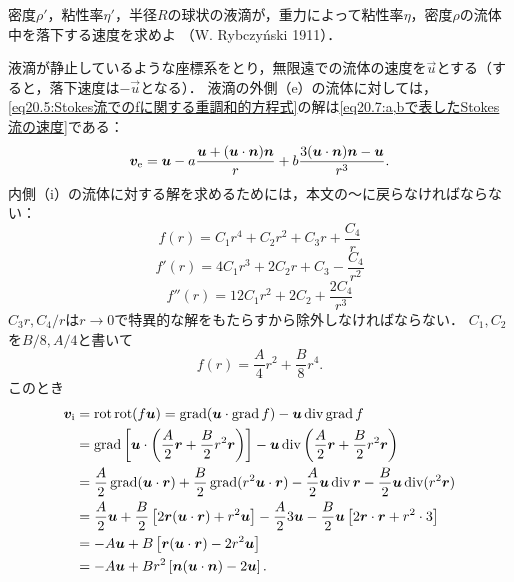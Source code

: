 \begin{mondai}{}{}
密度$\rho'$，粘性率$\eta'$，半径$R$の球状の液滴が，重力によって粘性率$\eta$，密度$\rho$の流体中を落下する速度を求めよ
（W. Rybczy\'{n}ski 1911）．
    
\end{mondai}
\begin{kaitou}
液滴が静止しているような座標系をとり，無限遠での流体の速度を$\vec{u}$とする（すると，落下速度は$-\vec{u}$となる）．
液滴の外側（e）の流体に対しては，\eqref{eq20.5:Stokes流でのfに関する重調和的方程式}の解は\eqref{eq20.7:a,bで表したStokes流の速度}である：
\[
    \vb*{v}_\mathrm{e} = \vb*{u} - a \frac{\vb*{u}+(\vb*{u}\cdot\vb*{n})\vb*{n}}{r} + b \frac{3(\vb*{u}\cdot\vb*{n})\vb*{n} - \vb*{u}}{r^3} .
\]
内側（i）の流体に対する解を求めるためには，本文の〜に戻らなければならない：
\[
    f(r) = C_1 r^4 + C_2 r^2 + C_3 r + \frac{C_4}{r}
\]
\[
    f'(r) = 4C_1 r^3 + 2C_2 r + C_3 - \frac{C_4}{r^2}
\]
\[
    f''(r) = 12C_1 r^2 + 2C_2 + \frac{2C_4}{r^3}
\]
$C_3r, C_4/r$は$r\to0$で特異的な解をもたらすから除外しなければならない．
$C_1,C_2$を$B/8, A/4$と書いて
\[
    f(r) = \frac{A}{4}r^2 + \frac{B}{8}r^4.
\]
このとき
\begin{align*}
    \vb*{v}_\mathrm{i} &= \operatorname{rot}\operatorname{rot}(f\vb*{u}) = \operatorname{grad}(\vb*{u}\cdot \operatorname{grad} f) - \vb*{u} \operatorname{div}\operatorname{grad} f \\
    &= \operatorname{grad} \left[ \vb*{u} \cdot \left( \frac{A}{2} \vb*{r} + \frac{B}{2}r^2 \vb*{r} \right) \right]
        -\vb*{u} \operatorname{div}\left( \frac{A}{2} \vb*{r} + \frac{B}{2}r^2 \vb*{r} \right) \\
    &= \frac{A}{2} \operatorname{grad}(\vb*{u}\cdot\vb*{r}) + \frac{B}{2} \operatorname{grad}(r^2\vb*{u}\cdot\vb*{r}) 
        -\frac{A}{2} \vb*{u} \operatorname{div}\vb*{r} - \frac{B}{2} \vb*{u} \operatorname{div}(r^2\vb*{r}) \\
    &= \frac{A}{2} \vb*{u} + \frac{B}{2} \left[ 2\vb*{r}(\vb*{u}\cdot\vb*{r}) + r^2\vb*{u} \right]
        -\frac{A}{2}3\vb*{u} - \frac{B}{2}\vb*{u} \left[ 2\vb*{r}\cdot\vb*{r} + r^2\cdot3 \right] \\
    &= -A\vb*{u} + B \left[ \vb*{r}(\vb*{u}\cdot\vb*{r}) - 2r^2 \vb*{u} \right] \\
    &= -A\vb*{u} + B r^2 \left[ \vb*{n}(\vb*{u}\cdot\vb*{n}) - 2 \vb*{u} \right].
\end{align*}


\end{kaitou}
